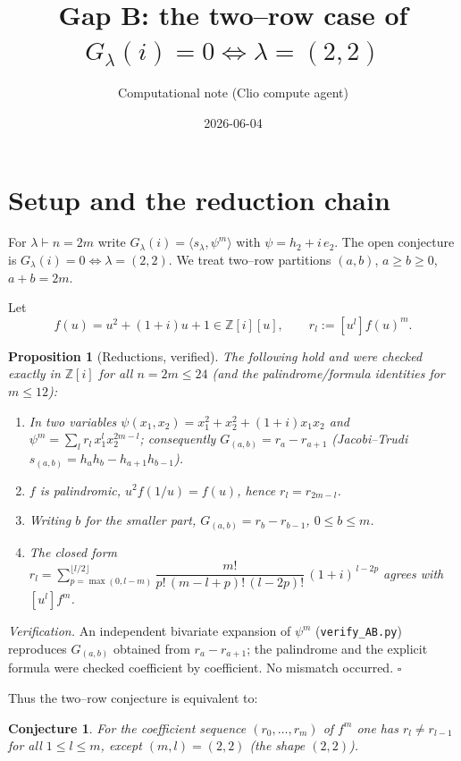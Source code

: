 \documentclass[11pt]{article}
\title{Gap B: the two--row case of $G_\lambda(i)=0\iff\lambda=(2,2)$}
\author{Computational note (Clio compute agent)}
\date{2026-06-04}
\newtheorem{proposition}{Proposition}
\newtheorem{conjecture}{Conjecture}
\theoremstyle{definition}
\newcommand{\Z}{\mathbb{Z}}
\newcommand{\Zi}{\Z[i]}
\begin{document}
\maketitle

\section{Setup and the reduction chain}

For $\lambda\vdash n=2m$ write $G_\lambda(i)=\langle s_\lambda,\psi^m\rangle$ with
$\psi=h_2+i\,e_2$. The open conjecture is $G_\lambda(i)=0\iff\lambda=(2,2)$.
We treat two--row partitions $(a,b)$, $a\ge b\ge0$, $a+b=2m$.

Let
\[
  f(u)=u^2+(1+i)u+1\in\Zi[u],\qquad r_l:=[u^l]f(u)^m .
\]

\begin{proposition}[Reductions, verified]\label{prop:red}
The following hold and were checked exactly in $\Zi$ for all $n=2m\le 24$
(and the palindrome/formula identities for $m\le 12$):
\begin{enumerate}
\item In two variables $\psi(x_1,x_2)=x_1^2+x_2^2+(1+i)x_1x_2$ and
  $\psi^m=\sum_{l}r_l\,x_1^{l}x_2^{2m-l}$; consequently
  $G_{(a,b)}=r_a-r_{a+1}$ (Jacobi--Trudi $s_{(a,b)}=h_ah_b-h_{a+1}h_{b-1}$).
\item $f$ is palindromic, $u^2f(1/u)=f(u)$, hence $r_l=r_{2m-l}$.
\item Writing $b$ for the smaller part, $G_{(a,b)}=r_b-r_{b-1}$, $0\le b\le m$.
\item The closed form
  $r_l=\sum_{p=\max(0,l-m)}^{\lfloor l/2\rfloor}
        \dfrac{m!}{p!\,(m-l+p)!\,(l-2p)!}\,(1+i)^{\,l-2p}$
  agrees with $[u^l]f^m$.
\end{enumerate}
\end{proposition}

\noindent\emph{Verification.} An independent bivariate expansion of $\psi^m$
(\texttt{verify\_AB.py}) reproduces $G_{(a,b)}$ obtained from $r_a-r_{a+1}$; the
palindrome and the explicit formula were checked coefficient by coefficient. No
mismatch occurred. $\square$

Thus the two--row conjecture is equivalent to:
\begin{conjecture}\label{conj:main}
For the coefficient sequence $(r_0,\dots,r_m)$ of $f^m$ one has
$r_l\ne r_{l-1}$ for all $1\le l\le m$, \emph{except} $(m,l)=(2,2)$
(the shape $(2,2)$).
\end{conjecture}
\end{document}
